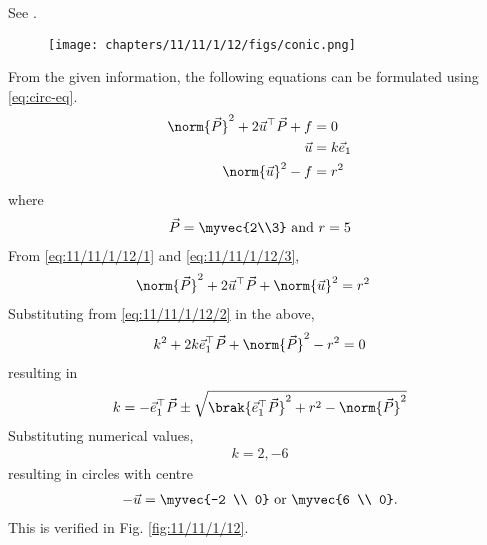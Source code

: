 See 
		.
	\begin{figure}[H]
		\centering
 \texttt{[image: chapters/11/11/1/12/figs/conic.png]}
		\caption{}
		\label{fig:11/11/1/12}
  	\end{figure}
From the given information, the following equations can be formulated
using 
	\eqref{eq:circ-eq}.
\begin{align}
		\label{eq:11/11/1/12/1}
	\norm{\vec{P}}^2 + 2 \vec{u}^{\top}\vec{P} + f &= 0
	\\
		\label{eq:11/11/1/12/2}
	\vec{u} &= k\vec{e}_1
	\\
		\label{eq:11/11/1/12/3}
	\norm{\vec{u}}^2 - f &= r^2
\end{align}
where 
\begin{align}
	\vec{P} = \myvec{2\\3} \text{ and } r = 5
\end{align}
From 
		\eqref{eq:11/11/1/12/1}
		and 
		\eqref{eq:11/11/1/12/3},
\begin{align}
	\norm{\vec{P}}^2 + 2 \vec{u}^{\top}\vec{P} + \norm{\vec{u}}^2 &= r^2
\end{align}
Substituting from 
		\eqref{eq:11/11/1/12/2} in the above, 
\begin{align}
	k^2  + 2k \vec{e}_1^{\top}\vec{P} + \norm{\vec{P}}^2- r^2 = 0
\end{align}
resulting in 
\begin{align}
	k =  - \vec{e}_1^{\top}\vec{P} \pm \sqrt{\brak{{ \vec{e}_1^{\top}\vec{P}  }}^2 + r^2 - \norm{\vec{P}}^2 } 
\end{align}
Substituting numerical values, 
\begin{align}
	k = 2, -6
\end{align}
resulting in circles with centre
\begin{align}
	-\vec{u} = \myvec{-2 \\ 0} \text{ or } \myvec{6 \\ 0}.
\end{align}
This is verified in Fig. 
		\eqref{fig:11/11/1/12}.
